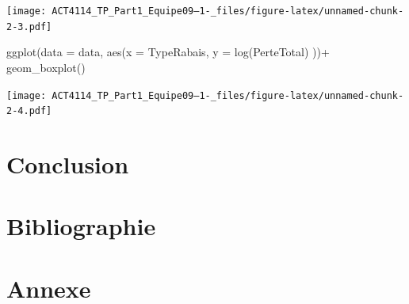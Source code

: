 \documentclass[
]{article}
\newenvironment{Shaded}{\begin{snugshade}}{\end{snugshade}}
\newcommand{\AttributeTok}[1]{\textcolor[rgb]{0.77,0.63,0.00}{#1}}
\newcommand{\FunctionTok}[1]{\textcolor[rgb]{0.00,0.00,0.00}{#1}}
\newcommand{\NormalTok}[1]{#1}
\newcommand{\SpecialCharTok}[1]{\textcolor[rgb]{0.00,0.00,0.00}{#1}}
\begin{document}
\texttt{[image: ACT4114\_TP\_Part1\_Equipe09--1-\_files/figure-latex/unnamed-chunk-2-3.pdf]}

\begin{Shaded}
\begin{Highlighting}[]
\FunctionTok{ggplot}\NormalTok{(}\AttributeTok{data =}\NormalTok{ data, }\FunctionTok{aes}\NormalTok{(}\AttributeTok{x =}\NormalTok{ TypeRabais, }\AttributeTok{y =} \FunctionTok{log}\NormalTok{(PerteTotal) ))}\SpecialCharTok{+}
  \FunctionTok{geom\_boxplot}\NormalTok{()}
\end{Highlighting}
\end{Shaded}

\texttt{[image: ACT4114\_TP\_Part1\_Equipe09--1-\_files/figure-latex/unnamed-chunk-2-4.pdf]}

\newpage

\hypertarget{conclusion}{%
\section{Conclusion}\label{conclusion}}

\newpage

\hypertarget{bibliographie}{%
\section{Bibliographie}\label{bibliographie}}

\newpage

\hypertarget{annexe}{%
\section{Annexe}\label{annexe}}
\end{document}
